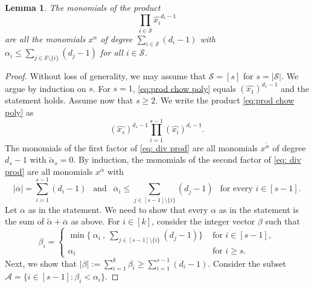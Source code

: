 \documentclass[11pt]{amsart}
\numberwithin{equation}{section}
\theoremstyle{plain}
\numberwithin{theorem}{section}
\newtheorem{lemma}[theorem]{Lemma}
\theoremstyle{definition}
\begin{document}
\begin{lemma}\label{lemma:product}
    The monomials of the product 
    \begin{equation}\label{eq:prod chow poly}
    \prod_{i\in\mathcal S}\widehat{x_i}^{d_i-1}
    \end{equation}
    are all the monomials $x^\alpha$ of degree $\displaystyle\sum_{i\in\mathcal S}(d_i-1)$ with $\displaystyle\alpha_i\leq \sum_{j\in\mathcal S\setminus\{i\}}(d_j-1)$ for all $i\in\mathcal S$.
\end{lemma}
\begin{proof}
    Without loss of generality, we may assume that $\mathcal S=[s]$ for $s=|\mathcal S|$. We argue by induction on $s$. For $s=1$, \eqref{eq:prod chow poly} equals $\left(\widehat{x_1}\right)^{d_1-1}$ and the statement holds. Assume now that $s\geq 2$. We write the product \eqref{eq:prod chow poly}  as 
    \begin{equation}
        \label{eq: div prod}
         \left(\widehat{x_s}\right)^{d_s-1}\prod_{i=1}^{s-1}\left(\widehat{x_i}\right)^{d_i-1}.
    \end{equation}
    The monomials of the first factor of \eqref{eq: div prod} are all monomials $x^{\tilde{\alpha}}$ of degree $d_s-1$ with $\tilde{\alpha}_s=0$. 
    By induction, the monomials of the second factor of \eqref{eq: div prod} are all monomials $x^{\overline{\alpha}}$ with 
    \begin{equation}\label{eq:mono cond}
    |\overline{\alpha}|=\sum_{i=1}^{s-1}(d_i-1)~~ \text{ and } ~~\overline{\alpha}_i\leq \sum_{j\in[s-1]\setminus\{i\}}(d_j-1) ~~\text{ for every } i\in[s-1]. 
    \end{equation}
    Let $\alpha$ as in the statement. We need to show that every $\alpha$ as in the statement is the sum of $\tilde{\alpha}+\overline{\alpha}$ as above.  For $i\in [k]$, consider the integer vector $\beta$ such that 
    \[
    \beta_i=\left\{
    \begin{array}{ll}
    \displaystyle\min\bigg\{~\alpha_i~,~\sum_{j\in[s-1]\setminus\{i\}}(d_j-1)\bigg\} & \text{ for } i\in[s-1],\\
    \alpha_i & \text{ for } i\geq s.
    \end{array}
    \right.
    \]
    Next, we show that $\displaystyle|\beta|:=\sum_{i=1}^k\beta_i\geq \sum_{i=1}^{s-1}(d_i-1)$. Consider the subset $\mathcal A=\{i\in[s-1]:\beta_i<\alpha_i\}$.
    

\end{proof}
\end{document}
